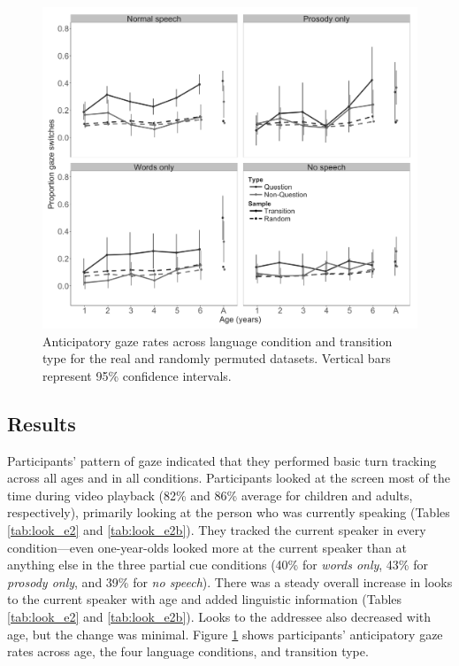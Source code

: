 \documentclass[authoryear, 12pt]{elsarticle}
\begin{document}
\begin{figure}[!ht]
\begin{center}
\includegraphics[width=\textwidth]{figures/E2-samples-by-lang-groups-trans-types.png}
\end{center}
\caption{Anticipatory gaze rates across language condition and transition type for the real and randomly permuted datasets. Vertical bars represent 95\% confidence intervals.}
\label{fig:E2-randvsreal}
\end{figure}

\subsection*{Results}
\label{sec:results2}

Participants' pattern of gaze indicated that they performed basic turn tracking across all ages and in all conditions. Participants looked at the screen most of the time during video playback (82\% and 86\% average for children and adults, respectively), primarily looking at the person who was currently speaking (Tables \ref{tab:look_e2} and \ref{tab:look_e2b}). They tracked the current speaker in every condition---even one-year-olds looked more at the current speaker than at anything else in the three partial cue conditions (40\% for \textit{words only}, 43\% for \textit{prosody only}, and 39\% for \textit{no speech}). There was a steady overall increase in looks to the current speaker with age and added linguistic information (Tables \ref{tab:look_e2} and \ref{tab:look_e2b}). Looks to the addressee also decreased with age, but the change was minimal. Figure \ref{fig:E2-randvsreal} shows participants' anticipatory gaze rates across age, the four language conditions, and transition type.
\end{document}

